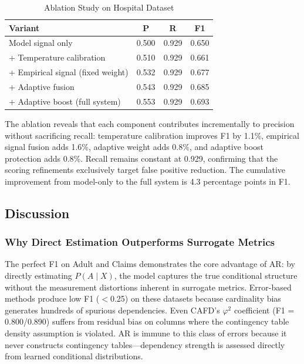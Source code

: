 \documentclass[conference]{IEEEtran}
\begin{document}
\begin{table}[t]
\caption{Ablation Study on Hospital Dataset}
\label{tab:ablation}
\centering
\begin{tabular}{lccc}
\toprule
\textbf{Variant} & \textbf{P} & \textbf{R} & \textbf{F1} \\
\midrule
Model signal only & 0.500 & 0.929 & 0.650 \\
+ Temperature calibration & 0.510 & 0.929 & 0.661 \\
+ Empirical signal (fixed weight) & 0.532 & 0.929 & 0.677 \\
+ Adaptive fusion & 0.543 & 0.929 & 0.685 \\
+ Adaptive boost (full system) & 0.553 & 0.929 & 0.693 \\
\bottomrule
\end{tabular}
\end{table}

The ablation reveals that each component contributes incrementally to precision without sacrificing recall: temperature calibration improves F1 by 1.1\%, empirical signal fusion adds 1.6\%, adaptive weight adds 0.8\%, and adaptive boost protection adds 0.8\%. Recall remains constant at 0.929, confirming that the scoring refinements exclusively target false positive reduction. The cumulative improvement from model-only to the full system is 4.3 percentage points in F1.

\subsection{Discussion}\label{sec:exp_discuss}

\subsubsection{Why Direct Estimation Outperforms Surrogate Metrics}
The perfect F1 on Adult and Claims demonstrates the core advantage of AR: by directly estimating $P(A \mid X)$, the model captures the true conditional structure without the measurement distortions inherent in surrogate metrics. Error-based methods produce low F1 ($<$0.25) on these datasets because cardinality bias generates hundreds of spurious dependencies. Even CAFD's $\varphi^2$ coefficient (F1 = 0.800/0.890) suffers from residual bias on columns where the contingency table density assumption is violated. AR is immune to this class of errors because it never constructs contingency tables---dependency strength is assessed directly from learned conditional distributions.
\end{document}
